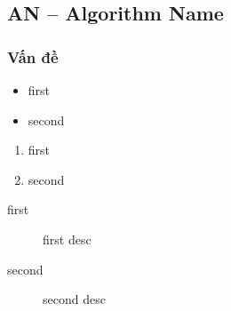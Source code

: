 \subsection{AN -- Algorithm Name}
\subsubsection{Vấn đề}
\begin{flushleft}
	\begin{itemize}
		\item first
		\item second
	\end{itemize}

	\begin{enumerate}
		\item first
		\item second
	\end{enumerate}

	\begin{description}
		\item[first] first desc
		\item[second] second desc
	\end{description}
\end{flushleft}
